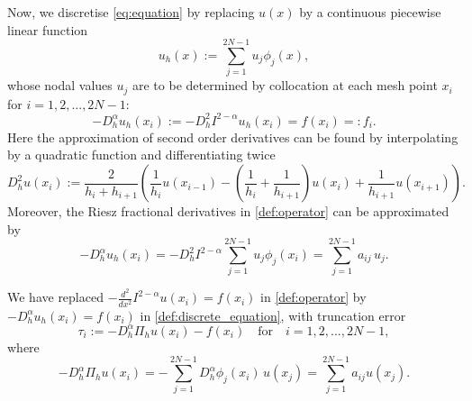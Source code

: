 \documentclass{amsart}
\theoremstyle{definition}
\theoremstyle{remark}
\numberwithin{equation}{section}
\begin{document}
Now, we discretise \eqref{eq:equation} by replacing \(u(x)\) by a continuous piecewise linear function
\begin{equation}
  u_h(x) := \sum_{j=1}^{2N-1} u_j \phi_j (x) ,
\end{equation}
whose nodal values \(u_j\) are to be determined by collocation at each mesh point \(x_i\) for \(i = 1, 2,...,2N - 1\):
\begin{equation} \label{def:discrete_equation}
  - D_h^{\alpha} u_h(x_i) := - D_h^2 I^{2-\alpha} u_h(x_i) = f(x_i) =: f_i .
\end{equation}
Here the approximation of second order derivatives can be found by interpolating by a quadratic function and differentiating twice \cite[eq.\,(1.14)]{LeVequeFiniteDifference}
\begin{equation} \label{def:Dh2}
  D_h^2 u(x_i) := \frac{2}{h_i + h_{i+1}} \left( \frac{1}{h_i} u(x_{i-1}) - \left( \frac{1}{h_i} + \frac{1}{h_{i+1}} \right) u(x_i) + \frac{1}{h_{i+1}} u(x_{i+1}) \right).
\end{equation}
Moreover, the Riesz fractional derivatives in \eqref{def:operator} can be approximated by
\begin{equation} \label{eq:AU}
  -  D_h^{\alpha} u_h(x_i) 
  =  - D_h^2 I^{2-\alpha} \sum_{j=1}^{2N-1}u_j \phi_j (x_i) 
  = \sum_{j=1}^{2N-1} a_{ij} \, u_j .
\end{equation}

We have replaced \(-\frac{d^2}{dx^2} I^{2-\alpha} u(x_i ) = f (x_i )\) in \eqref{def:operator} by \(- D_h^\alpha u_h(x_i ) = f (x_i )\) in \eqref{def:discrete_equation}, 
with truncation error 
\begin{equation} \label{def:truncation_error}
  \tau_i := -  D_h^{\alpha} \Pi_h u(x_i) - f(x_i)  \quad\text{for}\quad i = 1, 2, ... , 2N - 1 ,%
\end{equation}
where 
\begin{equation} \label{eq:AUhat}    
- D_h^{\alpha} \Pi_h u(x_i) =  -\sum_{j=1}^{2N-1} D_h^{\alpha} \phi_j(x_i) \, u(x_j) = \sum_{j=1}^{2N-1} a_{ij} u(x_j).
\end{equation}
\end{document}
